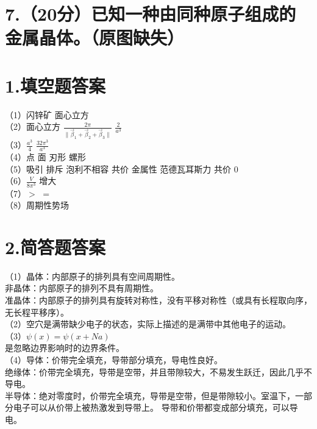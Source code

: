 \documentclass[UTF8]{ctexart}
\begin{document}
\section*{\bfseries 7.（20分）已知一种由同种原子组成的金属晶体。（原图缺失）}
\newpage
\section*{\bfseries 1.填空题答案}
（1）闪锌矿\makebox[2em]{}
面心立方\\
（2）面心立方\makebox[2em]{}
$\frac{2\pi}{\lVert\vec\beta_1+\vec\beta_2+\vec\beta_3\rVert}$\makebox[2em]{}
$\frac{2}{a^3}$\\
（3）$\frac{a^3}{4}$\makebox[2em]{}
$\frac{32\pi^3}{a^3}$\\
（4）点\makebox[2em]{}
面\makebox[2em]{}
刃形\makebox[2em]{}
螺形\\
（5）吸引\makebox[2em]{}
排斥\makebox[2em]{}
泡利不相容\makebox[2em]{}
共价\makebox[2em]{}
金属性\makebox[2em]{}
范德瓦耳斯力\makebox[2em]{}
共价\makebox[2em]{}
0\\
（6）$\frac{V}{8\pi^3}$\makebox[2em]{}
增大\\
（7）$>$\makebox[2em]{}
$=$\\
（8）周期性势场\\
\section*{\bfseries 2.简答题答案}
（1）晶体：内部原子的排列具有空间周期性。\\
非晶体：内部原子的排列不具有周期性。\\
准晶体：内部原子的排列具有旋转对称性，没有平移对称性（或具有长程取向序，无长程平移序）。\\
（2）空穴是满带缺少电子的状态，实际上描述的是满带中其他电子的运动。\\
（3）$\psi(x)=\psi(x+Na)$\\
是忽略边界影响时的边界条件。\\
（4）导体：价带完全填充，导带部分填充，导电性良好。\\
绝缘体：价带完全填充，导带是空带，并且带隙较大，不易发生跃迁，因此几乎不导电。\\
半导体：绝对零度时，价带完全填充，导带是空带，但是带隙较小。室温下，一部分电子可以从价带上被热激发到导带上。
导带和价带都变成部分填充，可以导电。
\end{document}
